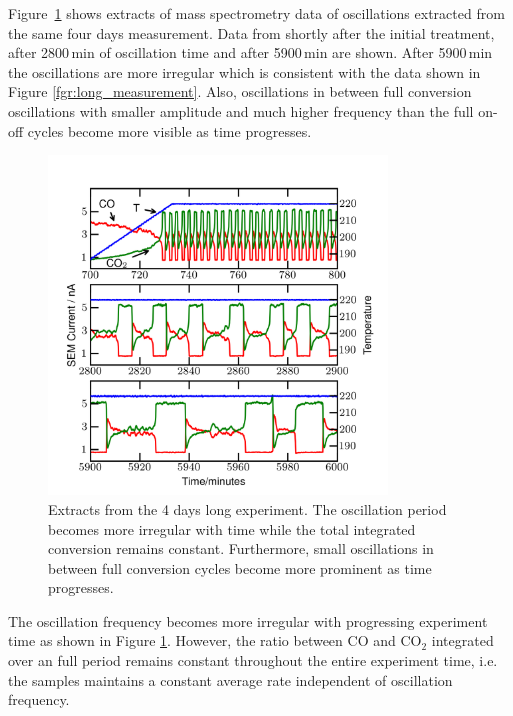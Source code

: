 \documentclass[8.5pt,twoside,twocolumn]{article}
\begin{document}
Figure~\ref{fgr:extracts} shows extracts of mass spectrometry data of
oscillations extracted from the same four days measurement. Data from shortly
after the initial treatment, after 2800\,min of oscillation time and after
5900\,min are shown. After 5900\,min the oscillations are more irregular which
is consistent with the data shown in Figure \ref{fgr:long_measurement}. Also,
oscillations in between full conversion oscillations with smaller amplitude and
much higher frequency than the full on-off cycles become more visible as time
progresses.

\begin{figure}[h]
  \centering
  \includegraphics[width=9cm]{extracts_from_very_long_oscillation.png}
  \caption{Extracts from the 4 days long experiment. The oscillation period
  becomes more irregular with time while the total integrated conversion
  remains constant. Furthermore, small oscillations in between full conversion
  cycles become more prominent as time progresses.}
  \label{fgr:extracts}
\end{figure}

The oscillation frequency becomes more irregular with progressing experiment
time as shown in Figure \ref{fgr:extracts}. However, the ratio between CO and
CO$_2$ integrated over an full period remains constant throughout the entire
experiment time, i.e. the samples maintains a constant average rate independent
of oscillation frequency.

\end{document}
